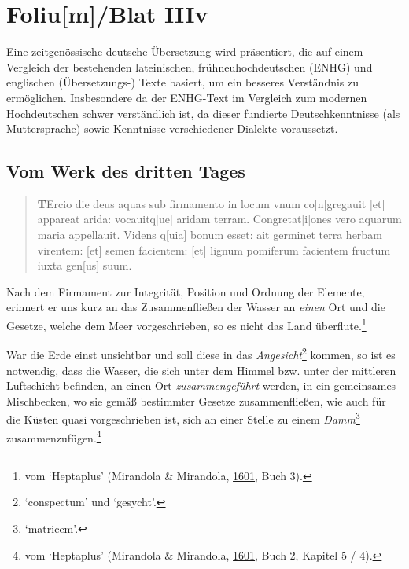 \documentclass[
]{article}
\author{Dietmar Gerald Schrausser}
\date{09.05.2026}
\begin{document}
\hypertarget{foliumblat-iiiv}{%
\section{Foliu{[}m{]}/Blat IIIv}\label{foliumblat-iiiv}}

Eine zeitgenössische deutsche Übersetzung wird präsentiert, die auf
einem Vergleich der bestehenden lateinischen, frühneuhochdeutschen
(ENHG) und englischen (Übersetzungs-) Texte basiert, um ein besseres
Verständnis zu ermöglichen. Insbesondere da der ENHG-Text im Vergleich
zum modernen Hochdeutschen schwer verständlich ist, da dieser fundierte
Deutschkenntnisse (als Muttersprache) sowie Kenntnisse verschiedener
Dialekte voraussetzt.

\hypertarget{vom-werk-des-dritten-tages}{%
\subsection{Vom Werk des dritten
Tages}\label{vom-werk-des-dritten-tages}}

\begin{quote}
\textbf{T}Ercio die deus aquas sub firmamento in locum vnum
co{[}n{]}gregauit {[}et{]} appareat arida: vocauitq{[}ue{]} aridam
terram. Congretat{[}i{]}ones vero aquarum maria appellauit. Videns
q{[}uia{]} bonum esset: ait germinet terra herbam virentem: {[}et{]}
semen facientem: {[}et{]} lignum pomiferum facientem fructum iuxta
gen{[}us{]} suum.
\end{quote}

Nach dem Firmament zur Integrität, Position und Ordnung der Elemente,
erinnert er uns kurz an das Zusammenfließen der Wasser an \emph{einen}
Ort und die Gesetze, welche dem Meer vorgeschrieben, so es nicht das
Land überflute.\footnote{vom `Heptaplus' (Mirandola \& Mirandola,
  \href{https://doi.org/10.3931/e-rara-61217}{1601}, Buch 3).}

War die Erde einst unsichtbar und soll diese in das
\emph{Angesicht}\footnote{`conspectum' und `gesycht'.} kommen, so ist es
notwendig, dass die Wasser, die sich unter dem Himmel bzw. unter der
mittleren Luftschicht befinden, an einen Ort \emph{zusammengeführt}
werden, in ein gemeinsames Mischbecken, wo sie gemäß bestimmter Gesetze
zusammenfließen, wie auch für die Küsten quasi vorgeschrieben ist, sich
an einer Stelle zu einem \emph{Damm}\footnote{`matricem'.}
zusammenzufügen.\footnote{vom `Heptaplus' (Mirandola \& Mirandola,
  \href{https://doi.org/10.3931/e-rara-61217}{1601}, Buch 2, Kapitel 5 /
  4).}
\end{document}
